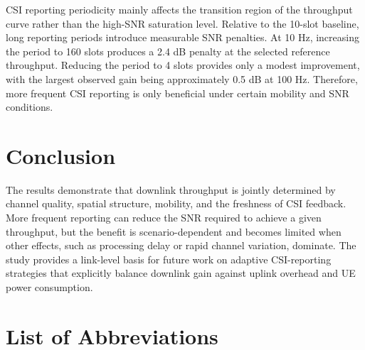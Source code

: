 \documentclass[a4paper,12pt,onecolumn]{article}
\begin{document}
		CSI reporting periodicity mainly affects the transition region of the throughput curve rather than the high-SNR saturation level. Relative to the 10-slot baseline, long reporting periods introduce measurable SNR penalties. At 10 Hz, increasing the period to 160 slots produces a 2.4 dB penalty at the selected reference throughput. Reducing the period to 4 slots provides only a modest improvement, with the largest observed gain being approximately 0.5 dB at 100 Hz. Therefore, more frequent CSI reporting is only beneficial under certain mobility and SNR conditions.
\section*{Conclusion}

	The results demonstrate that downlink throughput is jointly determined by channel quality, spatial structure, mobility, and the freshness of CSI feedback. More frequent reporting can reduce the SNR required to achieve a given throughput, but the benefit is scenario-dependent and becomes limited when other effects, such as processing delay or rapid channel variation, dominate. The study provides a link-level basis for future work on adaptive CSI-reporting strategies that explicitly balance downlink gain against uplink overhead and UE power consumption.
	
\newpage
\tableofcontents
\thispagestyle{empty}
\newpage

\section*{List of Abbreviations}
\thispagestyle{empty}
\end{document}
